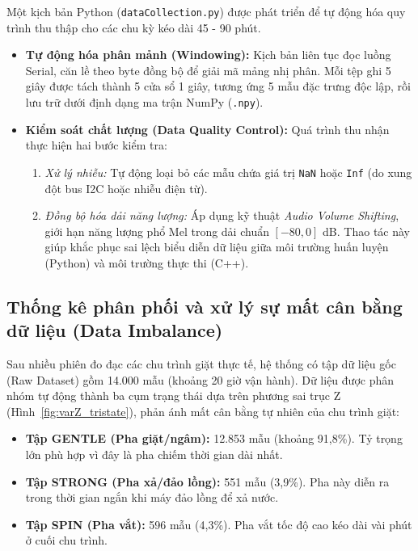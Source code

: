Một kịch bản Python (\texttt{dataCollection.py}) được phát triển để tự động hóa quy trình thu thập cho các chu kỳ kéo dài 45 - 90 phút.

\begin{itemize}
    \item \textbf{Tự động hóa phân mảnh (Windowing):} Kịch bản liên tục đọc luồng Serial, căn lề theo byte đồng bộ để giải mã mảng nhị phân. Mỗi tệp ghi 5 giây được tách thành 5 cửa sổ 1 giây, tương ứng 5 mẫu đặc trưng độc lập, rồi lưu trữ dưới định dạng ma trận NumPy (\texttt{.npy}).
    \item \textbf{Kiểm soát chất lượng (Data Quality Control):} Quá trình thu nhận thực hiện hai bước kiểm tra:
    \begin{enumerate}
        \item \textit{Xử lý nhiễu:} Tự động loại bỏ các mẫu chứa giá trị \texttt{NaN} hoặc \texttt{Inf} (do xung đột bus I2C hoặc nhiễu điện từ).
        \item \textit{Đồng bộ hóa dải năng lượng:} Áp dụng kỹ thuật \textit{Audio Volume Shifting}, giới hạn năng lượng phổ Mel trong dải chuẩn $[-80, 0]$ dB. Thao tác này giúp khắc phục sai lệch biểu diễn dữ liệu giữa môi trường huấn luyện (Python) và môi trường thực thi (C++).
    \end{enumerate}
\end{itemize}

\subsection{Thống kê phân phối và xử lý sự mất cân bằng dữ liệu (Data Imbalance)}
\label{subsec:data_distribution_balance}

Sau nhiều phiên đo đạc các chu trình giặt thực tế, hệ thống có tập dữ liệu gốc (Raw Dataset) gồm 14.000 mẫu (khoảng 20 giờ vận hành). Dữ liệu được phân nhóm tự động thành ba cụm trạng thái dựa trên phương sai trục Z (Hình~\ref{fig:varZ_tristate}), phản ánh mất cân bằng tự nhiên của chu trình giặt:

\begin{itemize}
    \item \textbf{Tập GENTLE (Pha giặt/ngâm):} 12.853 mẫu (khoảng 91,8\%). Tỷ trọng lớn phù hợp vì đây là pha chiếm thời gian dài nhất.
    \item \textbf{Tập STRONG (Pha xả/đảo lồng):} 551 mẫu (3,9\%). Pha này diễn ra trong thời gian ngắn khi máy đảo lồng để xả nước.
    \item \textbf{Tập SPIN (Pha vắt):} 596 mẫu (4,3\%). Pha vắt tốc độ cao kéo dài vài phút ở cuối chu trình.
\end{itemize}

